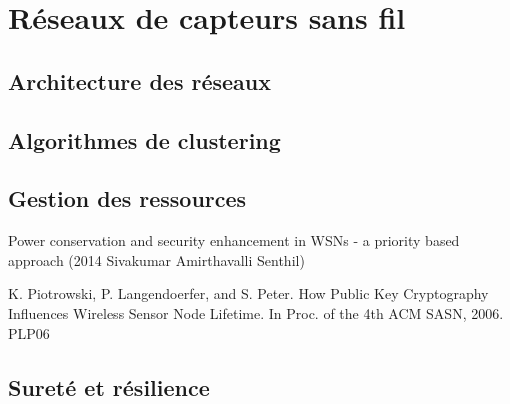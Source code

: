 \section{Réseaux de capteurs sans fil}

\subsection{Architecture des réseaux}

\subsection{Algorithmes de clustering}

\subsection{Gestion des ressources}

Power conservation and security enhancement in WSNs - a priority based approach (2014 Sivakumar Amirthavalli Senthil)

K. Piotrowski, P. Langendoerfer, and S. Peter. How Public Key Cryptography Influences Wireless Sensor Node Lifetime. In Proc. of the 4th ACM SASN, 2006.
PLP06

\subsection{Sureté et résilience}\label{ea:ssec:safety}
